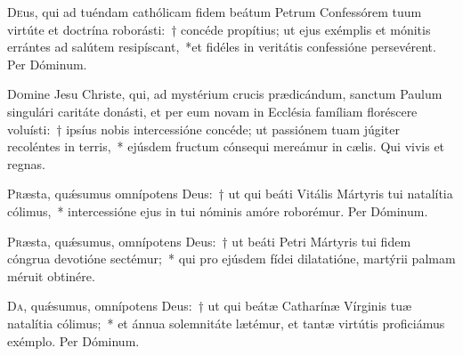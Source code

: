 \documentclass[vesperale_romanum.tex]{subfiles}
\begin{document}
\duplexmtv

\odoctoroptime

\oratio
\lettrine{D}{e}us, qui ad tuéndam cathólicam fidem beátum Petrum Confessórem tuum virtúte et doctrína roborásti:~† concéde propítius; ut ejus exémplis et mónitis errántes ad salútem  resipíscant,~*et fidéles in veritátis confessióne persevérent.
Per Dóminum.


\myrule
{}

\duplexmtv

\oratio

\lettrine{D}{o}mine Jesu Christe, qui, ad mystérium crucis prædicándum, sanctum Paulum singulári caritáte donásti, et per eum novam in Ecclésia famíliam floréscere voluísti:~† ipsíus nobis intercessióne concéde; ut passiónem tuam júgiter recoléntes in terris,~* ejúsdem fructum cónsequi mereámur in cælis.
Qui vivis et regnas.


\oratio

\lettrine{P}{r}æsta, quǽsumus omnípotens Deus:~† ut qui beáti Vitális Mártyris tui natalítia cólimus,~* intercessióne ejus in tui nóminis amóre roborémur. Per Dóminum.

\capitdeseq

\myrule
{}

\duplex

\oratio
 \lettrine{P}{r}æsta, quǽsumus, omnípotens Deus:~† ut beáti Petri Mártyris tui fidem cóngrua devotióne sectémur;~* qui pro ejúsdem fídei dilatatióne, martýrii palmam méruit obtinére.
   
   \capitdeseq   
\myrule
{}

\duplex

\oratio

\lettrine{D}{a}, quǽsumus, omnípotens Deus:~† ut qui beátæ Catharínæ Vírginis tuæ natalítia cólimus;~* et ánnua solemnitáte lætémur, et tantæ virtútis proficiámus exémplo.
Per Dóminum.
\end{document}
